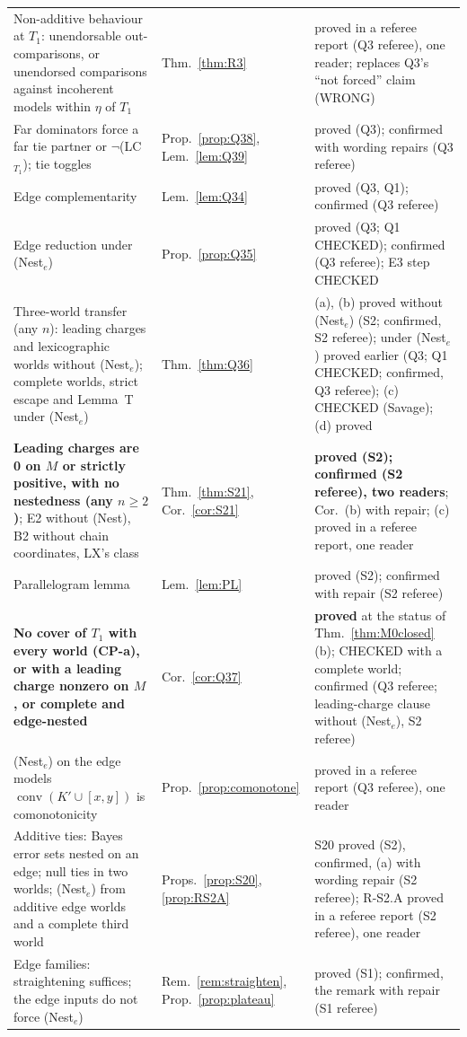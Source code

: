 \documentclass[11pt]{article}
\theoremstyle{definition}
\theoremstyle{remark}
\newcommand{\co}{\operatorname{conv}}
\begin{document}
{\begin{longtable}{>{\raggedright\arraybackslash}p{6.4cm}>{\raggedright\arraybackslash}p{2.1cm}>{\raggedright\arraybackslash}p{5.6cm}}
Non-additive behaviour at $T_1$: unendorsable out-comparisons, or unendorsed comparisons against incoherent models within $\eta$ of $T_1$ & Thm.~\ref{thm:R3} & proved in a referee report (Q3 referee), one reader; replaces Q3's ``not forced'' claim (WRONG)\\
Far dominators force a far tie partner or $\neg$(LC$_{T_1}$); tie toggles & Prop.~\ref{prop:Q38}, Lem.~\ref{lem:Q39} & proved (Q3); confirmed with wording repairs (Q3 referee)\\
Edge complementarity & Lem.~\ref{lem:Q34} & proved (Q3, Q1); confirmed (Q3 referee)\\
Edge reduction under (Nest$_e$) & Prop.~\ref{prop:Q35} & proved (Q3; Q1 CHECKED); confirmed (Q3 referee); E3 step CHECKED\\
Three-world transfer (any $n$): leading charges and lexicographic worlds without (Nest$_e$); complete worlds, strict escape and Lemma~T under (Nest$_e$) & Thm.~\ref{thm:Q36} & (a), (b) proved without (Nest$_e$) (S2; confirmed, S2 referee); under (Nest$_e$) proved earlier (Q3; Q1 CHECKED; confirmed, Q3 referee); (c) CHECKED (Savage); (d) proved\\
\textbf{Leading charges are 0 on $M$ or strictly positive, with no nestedness (any $n\ge2$)}; E2 without (Nest), B2 without chain coordinates, LX's class & Thm.~\ref{thm:S21}, Cor.~\ref{cor:S21} & \textbf{proved (S2); confirmed (S2 referee), two readers}; Cor.\ (b) with repair; (c) proved in a referee report, one reader\\
Parallelogram lemma & Lem.~\ref{lem:PL} & proved (S2); confirmed with repair (S2 referee)\\
\textbf{No cover of $T_1$ with every world (CP-a), or with a leading charge nonzero on $M$, or complete and edge-nested} & Cor.~\ref{cor:Q37} & \textbf{proved} at the status of Thm.~\ref{thm:M0closed}(b); CHECKED with a complete world; confirmed (Q3 referee; leading-charge clause without (Nest$_e$), S2 referee)\\
(Nest$_e$) on the edge models $\co(K'\cup[x,y])$ is comonotonicity & Prop.~\ref{prop:comonotone} & proved in a referee report (Q3 referee), one reader\\
Additive ties: Bayes error sets nested on an edge; null ties in two worlds; (Nest$_e$) from additive edge worlds and a complete third world & Props.~\ref{prop:S20}, \ref{prop:RS2A} & S20 proved (S2), confirmed, (a) with wording repair (S2 referee); R-S2.A proved in a referee report (S2 referee), one reader\\
Edge families: straightening suffices; the edge inputs do not force (Nest$_e$) & Rem.~\ref{rem:straighten}, Prop.~\ref{prop:plateau} & proved (S1); confirmed, the remark with repair (S1 referee)\\

\end{longtable}}
\end{document}
